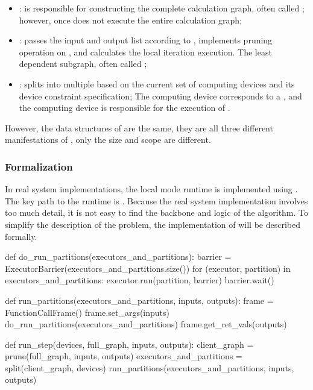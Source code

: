\begin{itemize}
  \item {}:  is responsible for constructing the complete calculation graph, often called ; however, once  does not execute the entire calculation graph;
  \item {}:  passes the  input and output list according to , implements pruning operation on , and calculates the local iteration execution. The least dependent subgraph, often called ;
  \item {}:  splits  into multiple  based on the current set of computing devices and its  device constraint specification; The computing device corresponds to a , and the computing device is responsible for the execution of .
\end{itemize}

However, the data structures of  are the same, they are all three different manifestations of , only the size and scope are different.


\subsubsection{Formalization}
In real system implementations, the local mode runtime is implemented using . The key path to the \tf{} runtime is . Because the real system implementation involves too much detail, it is not easy to find the backbone and logic of the algorithm. To simplify the description of the problem, the implementation of  will be described formally.

\begin{leftbar}
\begin{python}
def do_run_partitions(executors_and_partitions):
  barrier = ExecutorBarrier(executors_and_partitions.size())
  for (executor, partition) in executors_and_partitions:
    executor.run(partition, barrier)  
  barrier.wait()

def run_partitions(executors_and_partitions, inputs, outputs):
  frame = FunctionCallFrame()
  frame.set_args(inputs)
  do_run_partitions(executors_and_partitions)
  frame.get_ret_vals(outputs)

def run_step(devices, full_graph, inputs, outputs):
  client_graph = prune(full_graph, inputs, outputs)
  executors_and_partitions = split(client_graph, devices)
  run_partitions(executors_and_partitions, inputs, outputs)
\end{python}
\end{leftbar}

